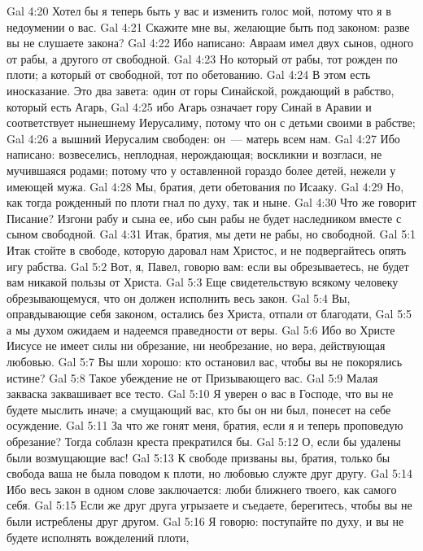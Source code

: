 \vs Gal 4:20 Хотел бы я теперь быть у вас и изменить голос мой, потому что я в недоумении о вас.
\rsbpar\vs Gal 4:21 Скажите мне вы, желающие быть под законом: разве вы не слушаете закона?
\vs Gal 4:22 Ибо написано: Авраам имел двух сынов, одного от рабы, а другого от свободной.
\vs Gal 4:23 Но который от рабы, тот рожден по плоти; а который от свободной, тот по обетованию.
\vs Gal 4:24 В этом есть иносказание. Это два завета: один от горы Синайской, рождающий в рабство, который есть Агарь,
\vs Gal 4:25 ибо Агарь означает гору Синай в Аравии и соответствует нынешнему Иерусалиму, потому что он с детьми своими в рабстве;
\vs Gal 4:26 а вышний Иерусалим свободен: он~--- матерь всем нам.
\vs Gal 4:27 Ибо написано: возвеселись, неплодная, нерождающая; воскликни и возгласи, не мучившаяся родами; потому что у оставленной гораздо более детей, нежели у имеющей мужа.
\vs Gal 4:28 Мы, братия, дети обетования по Исааку.
\vs Gal 4:29 Но, как тогда рожденный по плоти гнал  по духу, так и ныне.
\vs Gal 4:30 Что же говорит Писание? Изгони рабу и сына ее, ибо сын рабы не будет наследником вместе с сыном свободной.
\vs Gal 4:31 Итак, братия, мы дети не рабы, но свободной.
\vs Gal 5:1 Итак стойте в свободе, которую даровал нам Христос, и не подвергайтесь опять игу рабства.
\vs Gal 5:2 Вот, я, Павел, говорю вам: если вы обрезываетесь, не будет вам никакой пользы от Христа.
\vs Gal 5:3 Еще свидетельствую всякому человеку обрезывающемуся, что он должен исполнить весь закон.
\vs Gal 5:4 Вы, оправдывающие себя законом, остались без Христа, отпали от благодати,
\vs Gal 5:5 а мы духом ожидаем и надеемся праведности от веры.
\vs Gal 5:6 Ибо во Христе Иисусе не имеет силы ни обрезание, ни необрезание, но вера, действующая любовью.
\vs Gal 5:7 Вы шли хорошо: кто остановил вас, чтобы вы не покорялись истине?
\vs Gal 5:8 Такое убеждение не от Призывающего вас.
\vs Gal 5:9 Малая закваска заквашивает все тесто.
\vs Gal 5:10 Я уверен о вас в Господе, что вы не будете мыслить иначе; а смущающий вас, кто бы он ни был, понесет на себе осуждение.
\vs Gal 5:11 За что же гонят меня, братия, если я и теперь проповедую обрезание? Тогда соблазн креста прекратился бы.
\vs Gal 5:12 О, если бы удалены были возмущающие вас!
\rsbpar\vs Gal 5:13 К свободе призваны вы, братия, только бы свобода ваша не была поводом к  плоти, но любовью служте друг другу.
\vs Gal 5:14 Ибо весь закон в одном слове заключается: люби ближнего твоего, как самого себя.
\vs Gal 5:15 Если же друг друга угрызаете и съедаете, берегитесь, чтобы вы не были истреблены друг другом.
\rsbpar\vs Gal 5:16 Я говорю: поступайте по духу, и вы не будете исполнять вожделений плоти,
